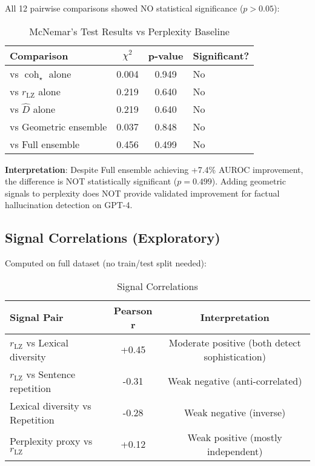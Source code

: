 \documentclass[11pt]{article}
\begin{document}
All 12 pairwise comparisons showed NO statistical significance ($p > 0.05$):

\begin{table}[h]
\centering
\caption{McNemar's Test Results vs Perplexity Baseline}
\label{tab:mcnemar}
\small
\begin{tabular}{lccl}
\toprule
\textbf{Comparison} & $\chi^2$ & \textbf{p-value} & \textbf{Significant?} \\
\midrule
vs $\operatorname{coh}_\star$ alone & 0.004 & 0.949 & No \\
vs $r_{\text{LZ}}$ alone & 0.219 & 0.640 & No \\
vs $\hat{D}$ alone & 0.219 & 0.640 & No \\
vs Geometric ensemble & 0.037 & 0.848 & No \\
vs Full ensemble & 0.456 & 0.499 & No \\
\bottomrule
\end{tabular}
\end{table}

\textbf{Interpretation}: Despite Full ensemble achieving +7.4\% AUROC improvement, the difference is NOT statistically significant ($p=0.499$). Adding geometric signals to perplexity does NOT provide validated improvement for factual hallucination detection on GPT-4.

\subsection{Signal Correlations (Exploratory)}

Computed on full dataset (no train/test split needed):

\begin{table}[h]
\centering
\caption{Signal Correlations}
\label{tab:correlations}
\begin{tabular}{lcc}
\toprule
\textbf{Signal Pair} & \textbf{Pearson r} & \textbf{Interpretation} \\
\midrule
$r_{\text{LZ}}$ vs Lexical diversity & +0.45 & Moderate positive (both detect sophistication) \\
$r_{\text{LZ}}$ vs Sentence repetition & -0.31 & Weak negative (anti-correlated) \\
Lexical diversity vs Repetition & -0.28 & Weak negative (inverse) \\
Perplexity proxy vs $r_{\text{LZ}}$ & +0.12 & Weak positive (mostly independent) \\
\bottomrule
\end{tabular}
\end{table}
\end{document}

